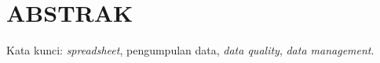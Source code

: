\clearpage
\chapter*{ABSTRAK}



\vspace{15mm}
Kata kunci: \textit{spreadsheet}, pengumpulan data, \textit{data quality}, \textit{data management}.
\clearpage